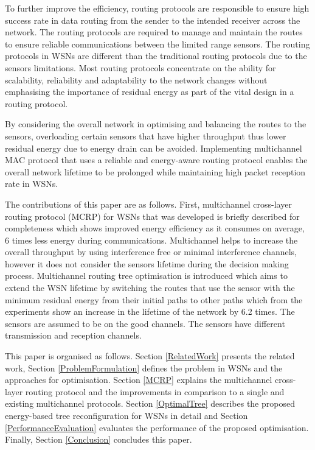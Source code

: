 To further improve the efficiency, routing protocols are responsible to ensure high success rate in data routing from the sender to the intended receiver across the network. 
The routing protocols are required to manage and maintain the routes to ensure reliable communications between the limited range sensors. The routing protocols in WSNs are different than the traditional routing protocols due to the sensors limitations. 
Most routing protocols concentrate on the ability for scalability, reliability and adaptability to the network changes without emphasising the importance of residual energy as part of the vital design in a routing protocol. 

By considering the overall network in optimising and balancing the routes to the sensors, overloading certain sensors that have higher throughput thus lower residual energy due to energy drain can be avoided.
Implementing multichannel MAC protocol that uses a reliable and energy-aware routing protocol enables the overall network lifetime to be prolonged while maintaining high packet reception rate in WSNs.

The contributions of this paper are as follows. First, multichannel cross-layer routing protocol (MCRP)\cite{mcrp} for WSNs that was developed is briefly described for completeness which shows improved energy efficiency as it consumes on average, 6 times less energy during communications.
Multichannel helps to increase the overall throughput by using interference free or minimal interference channels, however it does not consider the sensors lifetime during the decision making process. Multichannel routing tree optimisation is introduced which aims to extend the WSN lifetime by switching the routes that use the sensor with the minimum residual energy from their initial paths to other paths which from the experiments show an increase in the lifetime of the network by 6.2 times. 
The sensors are assumed to be on the good channels. The sensors have different transmission and reception channels. 

This paper is organised as follows. Section \ref{RelatedWork} presents the related work, Section \ref{ProblemFormulation} defines the problem in WSNs and the approaches for optimisation. Section \ref{MCRP} explains the multichannel cross-layer routing protocol and the improvements in comparison to a single and existing multichannel protocols.
Section \ref{OptimalTree} describes the proposed energy-based tree reconfiguration for WSNs in detail and Section \ref{PerformanceEvaluation} evaluates the performance of the proposed optimisation. Finally, Section \ref{Conclusion} concludes this paper.